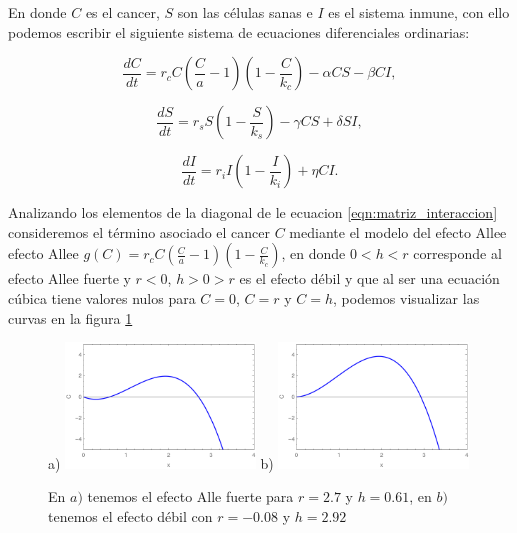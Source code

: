 \documentclass{article}
\begin{document}
En donde   $C$ es el cancer, $S$ son las células sanas e $I$ es el sistema inmune, con ello podemos escribir el siguiente sistema de ecuaciones diferenciales ordinarias:

\begin{equation}
    \frac{dC}{dt} =  r_c C (\frac{C}{a} - 1)(1-\frac{C}{k_c}) - \alpha CS - \beta CI,
    \label{eqn:cancer_dynamic}
\end{equation}

\begin{equation}
    \frac{dS}{dt} = r_s S (1 - \frac{S}{k_s})  - \gamma CS + \delta SI,
    \label{eqn:sano_dynamic}
\end{equation}


\begin{equation}
    \frac{dI}{dt} = r_i I(1-\frac{I}{k_i}) + \eta C I.
    \label{eqn:inmune_dynamic}
\end{equation}


Analizando los elementos de la diagonal de le ecuacion \ref{eqn:matriz_interaccion} consideremos el término asociado el cancer $C$ mediante el modelo del efecto Allee efecto Allee $g(C) = r_c C (\frac{C}{a} - 1)(1-\frac{C}{k_c})$, en donde $0<h<r$ corresponde al efecto Allee fuerte y $r<0$,  $h>0>r$ es el efecto débil y que al ser una ecuación cúbica tiene valores nulos para $C=0$, $C=r$ y $C=h$, podemos visualizar las curvas en la figura \ref{fig:allee_plots}

\begin{figure}[ht]
 \centering
  {
   \label{fig:strong_allee}
a)    \includegraphics[width=0.45\textwidth]{images/strong_allee.png}}
  {
   \label{fig:weak_allee}
b)    \includegraphics[width=0.45\textwidth]{images/allee_weak.png}}
  
 \caption{En $a)$ tenemos el efecto Alle fuerte para $r=2.7$ y $h=0.61$, en $b)$ tenemos el efecto débil con $r=-0.08$ y $h=2.92$}
 \label{fig:allee_plots}
\end{figure}
\end{document}
